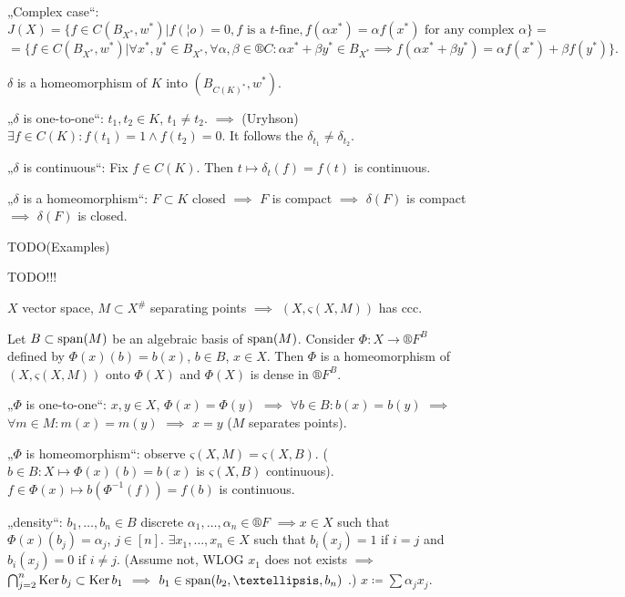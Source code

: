 \documentclass[12pt]{article}					%
\begin{document}
\begin{poznamka}
\begin{dukazin}
		„Complex case“:
		$$ J(X) = \{f \in C(B_{X^*}, w^*) | f(¦o) = 0, f \text{ is a $t$-fine}, f(αx^*) = αf(x^*) \text{ for any complex } α\} = $$
		$$ = \{f \in C(B_{X^*}, w^*) | \forall x^*, y^* \in B_{X^*}, \forall α, β \in ®C: αx^* + βy^* \in B_{X^*} \implies f(αx^* + βy^*) = αf(x^*) + βf(y^*)\}. $$
	\end{dukazin}

	$δ$ is a homeomorphism of $K$ into $(B_{C(K)^*}, w^*)$.
	\begin{dukazin}
		„$δ$ is one-to-one“: $t_1, t_2 \in K$, $t_1 ≠ t_2$. $\implies$ (Uryhson) $\exists f \in C(K): f(t_1) = 1 \land f(t_2) = 0$. It follows the $δ_{t_1} ≠ δ_{t_2}$.

		„$δ$ is continuous“: Fix $f \in C(K)$. Then $t \mapsto δ_t (f) = f(t)$ is continuous.

		„$δ$ is a homeomorphism“: $F \subset K$ closed $\implies$ $F$ is compact $\implies$ $δ(F)$ is compact $\implies$ $δ(F)$ is closed.
	\end{dukazin}
\end{poznamka}

TODO(Examples)


TODO!!!


\begin{veta}
	$X$ vector space, $M \subset X^{\#}$ separating points $\implies$ $(X, ς(X, M))$ has ccc.
\end{veta}

\begin{lemma}
	Let $B \subset \operatorname{span}(M)$ be an algebraic basis of $\operatorname{span}(M)$. Consider $Φ: X \rightarrow ®F^B$ defined by $Φ(x)(b) = b(x)$, $b \in B$, $x \in X$. Then $Φ$ is a homeomorphism of $(X, ς(X, M))$ onto $Φ(X)$ and $Φ(X)$ is dense in $®F^B$.

	\begin{dukazin}
		„$Φ$ is one-to-one“: $x, y \in X$, $Φ(x) = Φ(y)$ $\implies$ $\forall b \in B: b(x) = b(y)$ $\implies$ $\forall m \in M: m(x) = m(y)$ $\implies$ $x = y$ ($M$ separates points).

		„$Φ$ is homeomorphism“: observe $ς(X, M) = ς(X, B)$. ($b \in B: X \mapsto Φ(x)(b) = b(x)$ is $ς(X, B)$ continuous). $f \in Φ(x) \mapsto b(Φ^{-1}(f)) = f(b)$ is continuous.

		„density“: $b_1, …, b_n \in B$ discrete $α_1, …, α_n \in ®F$ $\implies x \in X$ such that $Φ(x)(b_j) = α_j$, $j \in [n]$. $\exists x_1, …, x_n \in X$ such that $b_i(x_j) = 1$ if $i = j$ and $b_i(x_j) = 0$ if $i ≠ j$. (Assume not, WLOG $x_1$ does not exists $\implies$ $\bigcap_{j=2}^n \operatorname{Ker} b_j \subset \operatorname{Ker} b_1$ $\implies$ $b_1 \in \spn(b_2, …, b_n)$ \lightning.) $x \coloneq \sum α_j x_j$.
	\end{dukazin}
\end{lemma}
\end{document}
